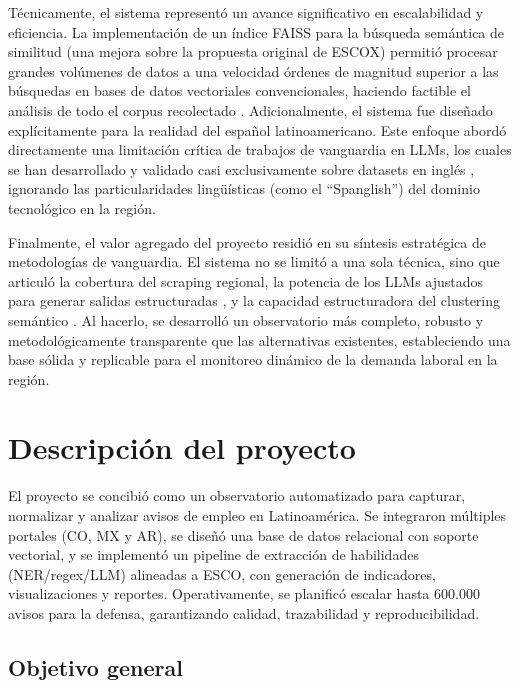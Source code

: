 Técnicamente, el sistema representó un avance significativo en escalabilidad y eficiencia. La implementación de un índice FAISS para la búsqueda semántica de similitud (una mejora sobre la propuesta original de ESCOX) permitió procesar grandes volúmenes de datos a una velocidad órdenes de magnitud superior a las búsquedas en bases de datos vectoriales convencionales, haciendo factible el análisis de todo el corpus recolectado \parencite{kavargyris2025, lukauskas2023}. Adicionalmente, el sistema fue diseñado explícitamente para la realidad del español latinoamericano. Este enfoque abordó directamente una limitación crítica de trabajos de vanguardia en LLMs, los cuales se han desarrollado y validado casi exclusivamente sobre datasets en inglés \parencite{herandi2024}, ignorando las particularidades lingüísticas (como el ``Spanglish'') del dominio tecnológico en la región.

Finalmente, el valor agregado del proyecto residió en su síntesis estratégica de metodologías de vanguardia. El sistema no se limitó a una sola técnica, sino que articuló la cobertura del scraping regional, la potencia de los LLMs ajustados para generar salidas estructuradas \parencite{herandi2024}, y la capacidad estructuradora del clustering semántico \parencite{lukauskas2023}. Al hacerlo, se desarrolló un observatorio más completo, robusto y metodológicamente transparente que las alternativas existentes, estableciendo una base sólida y replicable para el monitoreo dinámico de la demanda laboral en la región.

\section{Descripción del proyecto}

El proyecto se concibió como un observatorio automatizado para capturar, normalizar y analizar avisos de empleo en Latinoamérica. Se integraron múltiples portales (CO, MX y AR), se diseñó una base de datos relacional con soporte vectorial, y se implementó un pipeline de extracción de habilidades (NER/regex/LLM) alineadas a ESCO, con generación de indicadores, visualizaciones y reportes. Operativamente, se planificó escalar hasta 600.000 avisos para la defensa, garantizando calidad, trazabilidad y reproducibilidad.

\subsection{Objetivo general}

